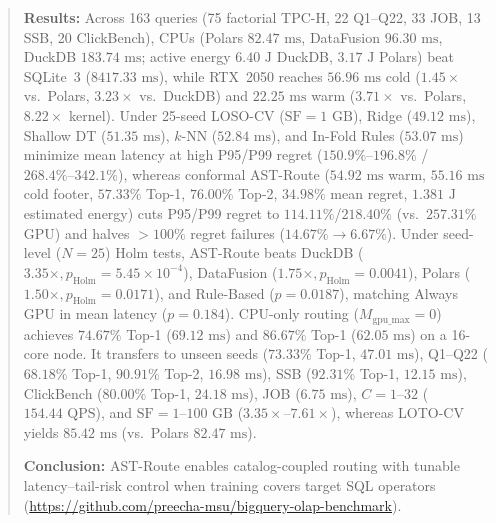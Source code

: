 \documentclass[10pt,a4paper]{article}
\begin{document}
\begin{quote}
\textbf{Results:} Across 163 queries (75 factorial TPC-H, 22 Q1--Q22, 33 JOB, 13 SSB, 20 ClickBench), CPUs (Polars $82.47\text{ ms}$, DataFusion $96.30\text{ ms}$, DuckDB $183.74\text{ ms}$; active energy $6.40\text{ J}$ DuckDB, $3.17\text{ J}$ Polars) beat SQLite~3 ($8417.33\text{ ms}$), while RTX~2050 reaches $56.96\text{ ms}$ cold ($1.45\times$ vs.\ Polars, $3.23\times$ vs.\ DuckDB) and $22.25\text{ ms}$ warm ($3.71\times$ vs.\ Polars, $8.22\times$ kernel). Under 25-seed LOSO-CV ($\text{SF}=1\text{ GB}$), Ridge ($49.12\text{ ms}$), Shallow DT ($51.35\text{ ms}$), $k$-NN ($52.84\text{ ms}$), and In-Fold Rules ($53.07\text{ ms}$) minimize mean latency at high P95/P99 regret ($150.9\%\text{--}196.8\%$ / $268.4\%\text{--}342.1\%$), whereas conformal AST-Route ($54.92\text{ ms}$ warm, $55.16\text{ ms}$ cold footer, $57.33\%$ Top-1, $76.00\%$ Top-2, $34.98\%$ mean regret, $1.381\text{ J}$ estimated energy) cuts P95/P99 regret to $114.11\%$/$218.40\%$ (vs.\ $257.31\%$ GPU) and halves $>100\%$ regret failures ($14.67\%\rightarrow 6.67\%$). Under seed-level ($N=25$) Holm tests, AST-Route beats DuckDB ($3.35\times, p_{\text{Holm}}=5.45\times 10^{-4}$), DataFusion ($1.75\times, p_{\text{Holm}}=0.0041$), Polars ($1.50\times, p_{\text{Holm}}=0.0171$), and Rule-Based ($p=0.0187$), matching Always GPU in mean latency ($p=0.184$). CPU-only routing ($M_{\text{gpu\_max}}=0$) achieves $74.67\%$ Top-1 ($69.12\text{ ms}$) and $86.67\%$ Top-1 ($62.05\text{ ms}$) on a 16-core node. It transfers to unseen seeds ($73.33\%$ Top-1, $47.01\text{ ms}$), Q1--Q22 ($68.18\%$ Top-1, $90.91\%$ Top-2, $16.98\text{ ms}$), SSB ($92.31\%$ Top-1, $12.15\text{ ms}$), ClickBench ($80.00\%$ Top-1, $24.18\text{ ms}$), JOB ($6.75\text{ ms}$), $C=1\text{--}32$ ($154.44\text{ QPS}$), and $\text{SF}=1\text{--}100\text{ GB}$ ($3.35\times\text{--}7.61\times$), whereas LOTO-CV yields $85.42\text{ ms}$ (vs.\ Polars $82.47\text{ ms}$).

\textbf{Conclusion:} AST-Route enables catalog-coupled routing with tunable latency--tail-risk control when training covers target SQL operators (\url{https://github.com/preecha-msu/bigquery-olap-benchmark}).
\end{quote}
\end{document}
